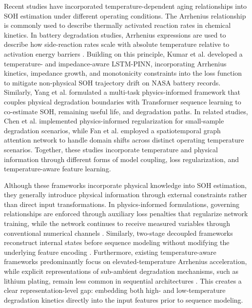 \documentclass[a4paper,fleqn]{cas-sc}
\begin{document}
Recent studies have incorporated temperature-dependent aging relationships into SOH estimation under different operating conditions. The Arrhenius relationship is commonly used to describe thermally activated reaction rates in chemical kinetics. In battery degradation studies, Arrhenius expressions are used to describe how side-reaction rates scale with absolute temperature relative to activation energy barriers \citep{kucinskis2022arrhenius}. Building on this principle, Kumar et al. \citep{kumar2026temperature} developed a temperature- and impedance-aware LSTM-PINN, incorporating Arrhenius kinetics, impedance growth, and monotonicity constraints into the loss function to mitigate non-physical SOH trajectory drift on NASA battery records. Similarly, Yang et al. \citep{yang2025physics} formulated a multi-task physics-informed framework that couples physical degradation boundaries with Transformer sequence learning to co-estimate SOH, remaining useful life, and degradation paths. In related studies, Chen et al. \citep{chen2025pinn} implemented physics-informed regularization for small-sample degradation scenarios, while Fan et al. \citep{fan2025spatiotemporal} employed a spatiotemporal graph attention network to handle domain shifts across distinct operating temperature scenarios. Together, these studies incorporate temperature and physical information through different forms of model coupling, loss regularization, and temperature-aware feature learning.

Although these frameworks incorporate physical knowledge into SOH estimation, they generally introduce physical information through external constraints rather than direct input transformations. In physics-informed formulations, governing relationships are enforced through auxiliary loss penalties that regularize network training, while the network continues to receive measured variables through conventional numerical channels \citep{yang2025physics}. Similarly, two-stage decoupled frameworks reconstruct internal states before sequence modeling without modifying the underlying feature encoding \citep{li2025unified}. Furthermore, existing temperature-aware frameworks predominantly focus on elevated-temperature Arrhenius acceleration, while explicit representations of sub-ambient degradation mechanisms, such as lithium plating, remain less common in sequential architectures \citep{kumar2026temperature,fan2025spatiotemporal}. This creates a clear representation-level gap: embedding both high- and low-temperature degradation kinetics directly into the input features prior to sequence modeling.
\end{document}
